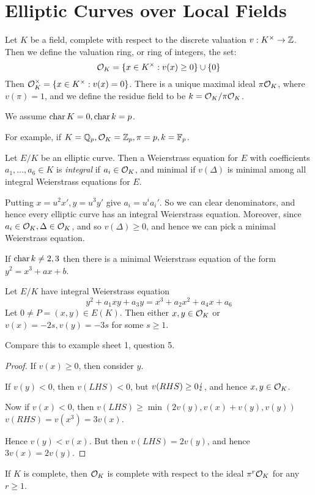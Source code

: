 \documentclass[10pt,a4paper]{article}
\begin{document}
\section{Elliptic Curves over Local Fields}
Let $K$ be a field, complete with respect to the discrete valuation $v: K^\times \to \mathbb{Z}$. Then we define the valuation ring, or ring of integers, the set:
\[\mathcal{O}_K = \{x \in K^\times : v(x) \geq 0 \} \cup\{0\}\]
Then $\mathcal{O}_K^\times = \{x \in K^\times : v(x) = 0\}$. There is a unique maximal ideal $\pi \mathcal{O}_K$, where $v(\pi) = 1$, and we define the residue field to be $k = \mathcal{O}_K/\pi\mathcal{O}_K$.

We assume $\operatorname{char} K = 0, \operatorname{char} k = p$.

For example, if $K = \mathbb{Q}_p, \mathcal{O}_K = \mathbb{Z}_p, \pi = p, k = \mathbb{F}_p$.

Let $E/K$ be an elliptic curve. Then a Weierstrass equation for $E$ with coefficients $a_1, \ldots, a_6 \in K$ is \emph{integral} if $a_i \in \mathcal{O}_K$, and minimal if $v(\Delta)$ is minimal among all integral Weierstrass equations for $E$.

Putting $x = u^2x', y = u^3y'$ give $a_i = u^i a_i'$. So we can clear denominators, and hence every elliptic curve has an integral Weierstrass equation. Moreover, since $a_i \in \mathcal{O}_K, \Delta \in \mathcal{O}_K$, and so $v(\Delta) \geq 0$, and hence we can pick a minimal Weierstrass equation.

If $\operatorname{char} k \neq 2, 3$ then there is a minimal Weierstrass equation of the form $y^2 = x^3+ax+b$.

\begin{lemma}
  Let $E/K$ have integral Weierstrass equation
  \[y^2+a_1xy+a_3y = x^3+a_2x^2+a_4x+a_6\]
  Let $0 \neq P = (x,y) \in E(K)$. Then either $x, y \in \mathcal{O}_K$ or $v(x) = -2s, v(y) = -3s$ for some $s \geq 1$.
\end{lemma}
Compare this to example sheet 1, question 5.
\begin{proof}
  If $v(x) \geq 0$, then consider $y$.

  If $v(y) < 0$, then $v(LHS) < 0$, but $v(RHS) \geq 0 \lightning$, and hence $x, y \in \mathcal{O}_K$.

  Now if $v(x)<0$, then $v(LHS) \geq \min(2v(y), v(x)+v(y), v(y))$\\
  $v(RHS) = v(x^3) = 3v(x)$.

  Hence $v(y) < v(x)$. But then $v(LHS) = 2v(y)$, and hence $3v(x) = 2v(y)$.
\end{proof}
If $K$ is complete, then $\mathcal{O}_K$ is complete with respect to the ideal $\pi^r \mathcal{O}_K$ for any $r \geq 1$.
\end{document}

